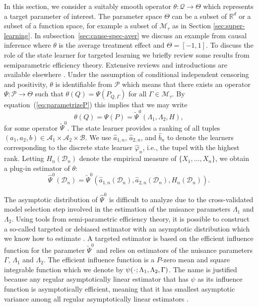 \documentclass[numsec,webpdf,contemporary,medium,namedate]{oup-authoring-template}%
\theoremstyle{thmstyleone}%
\theoremstyle{thmstyletwo}%
\theoremstyle{thmstylethree}%
\newcommand{\R}{\mathbb{R}}
\newcommand{\blank}{\makebox[1ex]{\textbf{$\cdot$}}}
\renewcommand{\phi}{\varphi}
\newcommand{\1}{\mathds{1}}
\newcommand{\data}{\ensuremath{\mathcal{D}}}
\begin{document}
In this section, we consider a suitably smooth operator
\( \theta \colon \mathcal{Q} \rightarrow \Theta \) which represents a
target parameter of interest. The parameter space $\Theta$ can be a
subset of \(\R^d\) or a subset of a function space, for example a
subset of \(\mathcal{M}_{\tau}\) as in Section
\ref{sec:super-learning}. In subsection~\ref{sec:cause-spec-aver} we
discuss an example from causal inference where $\theta$ is the average
treatment effect and \( \Theta = [-1,1] \).  To discuss the role of
the state learner for targeted learning we briefly review some results
from semiparametric efficiency theory. Extensive reviews and
introductions are available elsewhere
\cite[e.g.,][]{pfanzagl1985contributions,bickel1993efficient,van2003unified,tsiatis2007semiparametric,kennedy2016semiparametric}.
Under the assumption of conditional independent censoring and
positivity, $\theta$ is identifiable from \( \mathcal{P} \) which
means that there exists an operator
\( \Psi \colon \mathcal{P} \rightarrow \Theta \) such that
\( \theta(Q) = \Psi(P_{Q, \Gamma}) \) for all
$\Gamma \in \mathcal{M}_{\tau}$.  By equation~(\ref{eq:parametrizeP})
this implies that we may write
\begin{equation*}
  \theta(Q) = \Psi(P) = \tilde{\Psi}^0(\Lambda_1, \Lambda_2, H),
\end{equation*}
for some operator \( \tilde{\Psi}^0 \). The state learner provides a
ranking of all tuples
\( (a_1, a_2, b) \in \mathcal{A}_1 \times \mathcal{A}_2 \times
\mathcal{B} \). We use \( \hat{a}_{1,n} \), \( \hat{a}_{2,n} \), and
\( \hat{b}_n \) to denote the learners corresponding to the discrete
state learner \( \hat{\phi}_n \), i.e., the tupel with the highest
rank. Letting \( H_n(\data_n) \) denote the empirical measure of
\( \{X_1, \dots, X_n\} \), we obtain a plug-in estimator of $\theta$:
\begin{equation}
  \label{eq:2}
  \hat{\Psi}^0(\data_n) =
  \tilde{\Psi}^0(\hat{a}_{1,n}(\data_n), \hat{a}_{2,n}(\data_n), H_n(\data_n)). 
\end{equation}

The asymptotic distribution of \( \hat{\Psi}^0 \) is
difficult to analyze due to the cross-validated model selection step
involved in the estimation of the nuisance parameters $\Lambda_1$ and
$\Lambda_2$.
Using tools from semi-parametric efficiency theory, it is possible to
construct a so-called targeted or debiased estimator with an
asymptotic distribution which we know how to estimate
\citep{bickel1993efficient,van2011targeted,chernozhukov2018double}. A
targeted estimator is based on the efficient influence function for
the parameter $\tilde{\Psi}^0$ and relies on estimators of the
nuisance parameters $\Gamma$, \( \Lambda_1 \) and $\Lambda_2$. The
efficient influence function is a \( P \)-zero mean and square
integrable function which we denote by
\( \psi(\blank ; \Lambda_1, \Lambda_2, \Gamma) \). The name is
justified because any regular asymptotically linear estimator that has
\( \psi \) as its influence function is asymptotically efficient,
meaning that it has smallest asymptotic variance among all regular
asymptotically linear estimators \citep{bickel1993efficient}.
\end{document}
